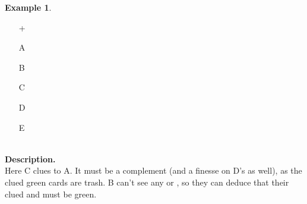 \documentclass[a4paper]{article}
\theoremstyle{plain}
\theoremstyle{definition}
\newtheorem{example}[theorem]{Example}
\begin{document}
\begin{example}	\hfill \\
	\begin{minipage}{0.45\textwidth}
		\begin{itemize}
			\item[\Large +]      
			\item[\Large A]    
			\item[\Large B]    
			\item[\Large C]    
			\item[\Large D]    
			\item[\Large E]    
		\end{itemize}
	\end{minipage}%
	\begin{minipage}{0.55\textwidth}
		\hfill \\
		
		\textbf{Description.} \\
		
		Here C clues  to A. It must be a complement (and a finesse on D's  as well), as the clued green cards are trash. B can't see any  or , so they can deduce that their clued  and  must be green.
	\end{minipage}
\end{example} \vspace{0.15 cm}
\end{document}
